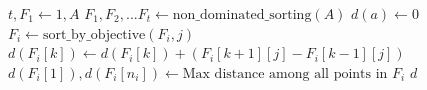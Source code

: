 \begin{algorithm}[H]
\caption{$\text{crowding\_distance}[Case](A)$}
\label{mopso:crowding_distance}
\begin{algorithmic}[1]
 
\State $t,F_1 \gets 1, A$
\EndIf
{} 
\State $F_1,F_2,...F_t \gets \text{non\_dominated\_sorting}(A)$
\EndIf
{}
        \State $d(a) \gets 0$
    \EndFor
     
        \State $F_i \gets \text{sort\_by\_objective}(F_i,j)$ 
         
            \State $d(F_i[k]) \gets d(F_i[k]) + (F_i[k+1][j] - F_i[k-1][j])$
        \EndFor
        \State $d(F_i[1]), d(F_i[n_i])  \gets \text{Max distance among all points in } F_i $
    \EndFor
\EndFor
\State \Return $d$
\end{algorithmic}
\end{algorithm}



